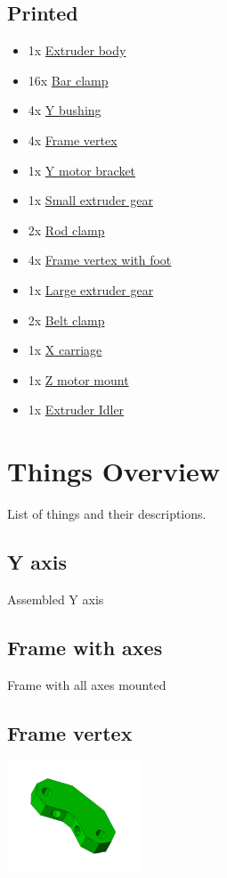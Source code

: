 \documentclass[11pt]{article}
\begin{document}
\subsection{Printed}
\begin{itemize}
\item 1x \hyperlink{thing_extruder-body}{Extruder body}
\item 16x \hyperlink{thing_bar-clamp}{Bar clamp}
\item 4x \hyperlink{thing_y-bushing}{Y bushing}
\item 4x \hyperlink{thing_frame-vertex}{Frame vertex}
\item 1x \hyperlink{thing_y-motor-bracket}{Y motor bracket}
\item 1x \hyperlink{thing_small-gear}{Small extruder gear}
\item 2x \hyperlink{thing_rod-clamp}{Rod clamp}
\item 4x \hyperlink{thing_frame-vertex-foot}{Frame vertex with foot}
\item 1x \hyperlink{thing_large-gear}{Large extruder gear}
\item 2x \hyperlink{thing_belt-clamp}{Belt clamp}
\item 1x \hyperlink{thing_x-carriage}{X carriage}
\item 1x \hyperlink{thing_z-motor-mount}{Z motor mount}
\item 1x \hyperlink{thing_idler}{Extruder Idler}
\end{itemize}

\newpage

\section{Things Overview}
List of things and their descriptions.

\hypertarget{thing_y-axis}{\subsection{Y axis}}
Assembled Y axis

\hypertarget{thing_frame-with-axes}{\subsection{Frame with axes}}
Frame with all axes mounted

\hypertarget{thing_frame-vertex}{\subsection{Frame vertex}}
\includegraphics[width=4cm]{images/frame-vertex.jpg}
\end{document}
